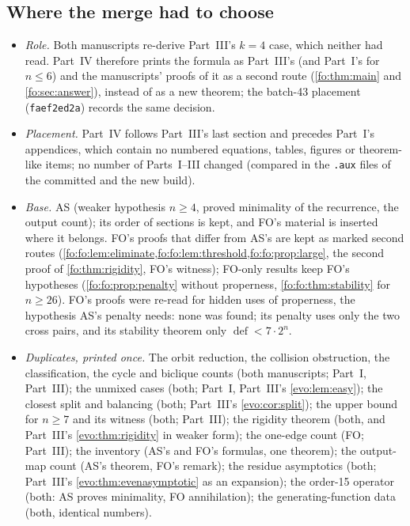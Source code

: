 \documentclass[11pt,a4paper]{article}
\numberwithin{equation}{section}
\theoremstyle{definition}
\theoremstyle{remark}
\newcommand{\defi}{\operatorname{def}}
\begin{document}
\subsection{Where the merge had to choose}\label{fo:sec:merge}
\begin{itemize}
\item \emph{Role.} Both manuscripts re-derive Part~III's $k=4$ case, which
 neither had read. Part~IV therefore prints the formula as Part~III's (and
 Part~I's for $n\le6$) and the manuscripts' proofs of it as a second route
 (\cref{fo:thm:main} and \cref{fo:sec:answer}), instead of as a new theorem;
 the batch-43 placement (\texttt{faef2ed2a}) records the same decision.
\item \emph{Placement.} Part~IV follows Part~III's last section and precedes
 Part~I's appendices, which contain no numbered equations, tables, figures or
 theorem-like items; no number of Parts~I--III changed (compared in the
 \texttt{.aux} files of the committed and the new build).
\item \emph{Base.} AS (weaker hypothesis $n\ge4$, proved minimality of the
 recurrence, the output count); its order of sections is kept, and FO's
 material is inserted where it belongs. FO's proofs that differ from AS's are
 kept as marked second routes (\cref{fo:fo:lem:eliminate,fo:fo:lem:threshold,fo:fo:prop:large},
 the second proof of \cref{fo:thm:rigidity}, FO's witness); FO-only results
 keep FO's hypotheses (\cref{fo:fo:prop:penalty} without properness,
 \cref{fo:fo:thm:stability} for $n\ge26$). FO's proofs were re-read for hidden
 uses of properness, the hypothesis AS's penalty needs: none was found; its penalty uses only the
 two cross pairs, and its stability theorem only $\defi<7\cdot2^n$.
\item \emph{Duplicates, printed once.} The orbit reduction, the collision
 obstruction, the classification, the cycle and biclique counts (both
 manuscripts; Part~I, Part~III); the unmixed cases (both; Part~I, Part~III's
 \cref{evo:lem:easy}); the closest split and balancing (both; Part~III's
 \cref{evo:cor:split}); the upper bound for $n\ge7$ and its witness (both;
 Part~III); the rigidity theorem (both, and Part~III's \cref{evo:thm:rigidity}
 in weaker form); the one-edge count (FO; Part~III); the inventory (AS's and
 FO's formulas, one theorem); the output-map count (AS's theorem, FO's remark);
 the residue asymptotics (both; Part~III's \cref{evo:thm:evenasymptotic} as an
 expansion); the order-15 operator (both: AS proves minimality, FO annihilation);
 the generating-function data (both, identical numbers).

\end{itemize}
\end{document}

